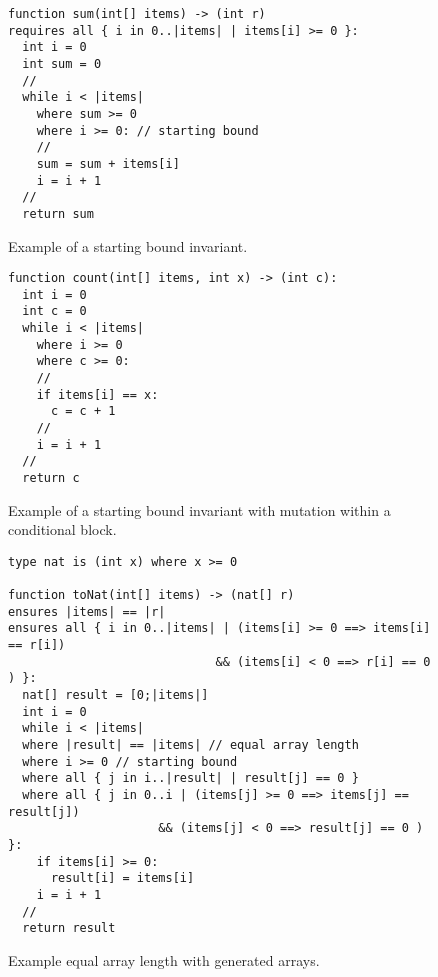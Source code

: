 \begin{appendices}
\begin{figure}[ht]
\begin{lstlisting}
function sum(int[] items) -> (int r)
requires all { i in 0..|items| | items[i] >= 0 }:
  int i = 0
  int sum = 0
  //
  while i < |items|
    where sum >= 0
    where i >= 0: // starting bound
    //
    sum = sum + items[i]
    i = i + 1
  //
  return sum
\end{lstlisting}
\caption{Example of a starting bound invariant.}
\end{figure}

\begin{figure}[ht]
\begin{lstlisting}
function count(int[] items, int x) -> (int c):
  int i = 0
  int c = 0
  while i < |items|
    where i >= 0
    where c >= 0:
    //
    if items[i] == x:
      c = c + 1
    //
    i = i + 1
  //
  return c
\end{lstlisting}
\caption{Example of a starting bound invariant with mutation within a conditional block.}
\end{figure}


\begin{figure}[ht]
\begin{lstlisting}
type nat is (int x) where x >= 0

function toNat(int[] items) -> (nat[] r)
ensures |items| == |r|
ensures all { i in 0..|items| | (items[i] >= 0 ==> items[i] == r[i])
                             && (items[i] < 0 ==> r[i] == 0 ) }:
  nat[] result = [0;|items|]
  int i = 0
  while i < |items|
  where |result| == |items| // equal array length
  where i >= 0 // starting bound
  where all { j in i..|result| | result[j] == 0 }
  where all { j in 0..i | (items[j] >= 0 ==> items[j] == result[j]) 
                     && (items[j] < 0 ==> result[j] == 0 ) }:
    if items[i] >= 0:
      result[i] = items[i]
    i = i + 1
  //
  return result
\end{lstlisting}
\caption{Example equal array length with generated arrays.}
\end{figure}



\end{appendices}
